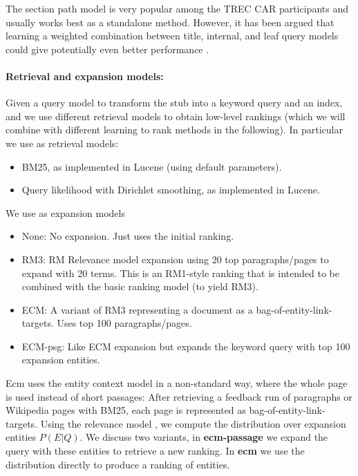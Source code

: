 \documentclass{article}
\begin{document}
The section path model is very popular among the TREC CAR participants and usually works best as a standalone method. However, it has been argued that learning a weighted combination between title, internal, and leaf query models could give potentially even better performance \cite{macavaney2018overcoming}.


\paragraph{Retrieval and expansion models:}

Given a query model to transform the stub into a keyword query and an index, and we  use different retrieval models to obtain low-level rankings (which we will combine with different learning to rank methods in the following). In particular we use as retrieval models:

\begin{itemize}
    \item BM25, as implemented in Lucene (using default parameters).
    \item Query likelihood with Dirichlet smoothing, as implemented in Lucene.
\end{itemize}

We use as expansion models    
\begin{itemize}
    \item None: No expansion. Just uses the initial ranking.
    \item RM3: RM Relevance model expansion \cite{lavrenko2017relevance} using 20 top paragraphs/pages to expand with 20 terms. This is an RM1-style ranking that is intended to be combined with the basic ranking model (to yield RM3).
    \item ECM: A variant of RM3 representing a document as a bag-of-entity-link-targets. Uses top 100 paragraphs/pages.
    \item ECM-psg: Like ECM expansion but expands the keyword query with top 100 expansion entities.
\end{itemize}

Ecm uses the entity context model in a non-standard way, where the whole page is used instead of short passages: After retrieving a feedback run of paragraphs or Wikipedia pages with BM25, each page is represented as bag-of-entity-link-targets. Using the relevance model \cite{lavrenko2017relevance}, we compute the distribution over expansion entities $P(E|Q)$. We discuss two variants, in \textbf{ecm-passage} we expand the query with these entities to retrieve a new ranking. In \textbf{ecm} we use the distribution directly to produce a ranking of entities.
\end{document}
